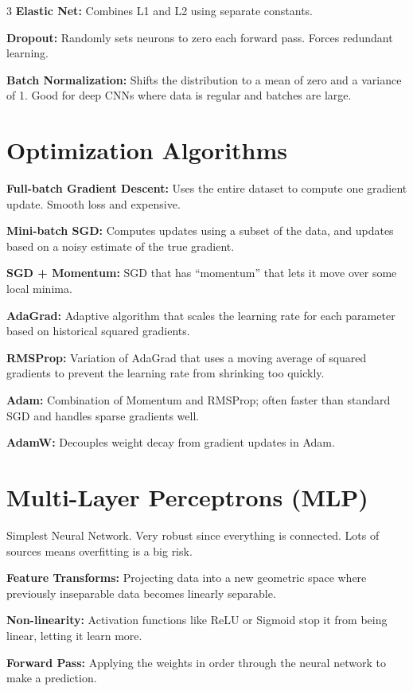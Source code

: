 \documentclass[6pt,landscape,a4paper]{extarticle}
\begin{document}
\begin{multicols}{3}
\textbf{Elastic Net:} Combines L1 and L2 using separate constants.

\textbf{Dropout:} Randomly sets neurons to zero each forward pass. Forces redundant learning.

\textbf{Batch Normalization:} Shifts the distribution to a mean of zero and a variance of 1. Good for deep CNNs where data is regular and batches are large.

\section{Optimization Algorithms}

\textbf{Full-batch Gradient Descent:} Uses the entire dataset to compute one gradient update. Smooth loss and expensive.

\textbf{Mini-batch SGD:} Computes updates using a subset of the data, and updates based on a noisy estimate of the true gradient.

\textbf{SGD + Momentum:} SGD that has ``momentum'' that lets it move over some local minima.

\textbf{AdaGrad:} Adaptive algorithm that scales the learning rate for each parameter based on historical squared gradients.

\textbf{RMSProp:} Variation of AdaGrad that uses a moving average of squared gradients to prevent the learning rate from shrinking too quickly.

\textbf{Adam:} Combination of Momentum and RMSProp; often faster than standard SGD and handles sparse gradients well.

\textbf{AdamW:} Decouples weight decay from gradient updates in Adam.

\section{Multi-Layer Perceptrons (MLP)}

Simplest Neural Network. Very robust since everything is connected. Lots of sources means overfitting is a big risk.

\textbf{Feature Transforms:} Projecting data into a new geometric space where previously inseparable data becomes linearly separable.

\textbf{Non-linearity:} Activation functions like ReLU or Sigmoid stop it from being linear, letting it learn more.

\textbf{Forward Pass:} Applying the weights in order through the neural network to make a prediction.


\end{multicols}
\end{document}
